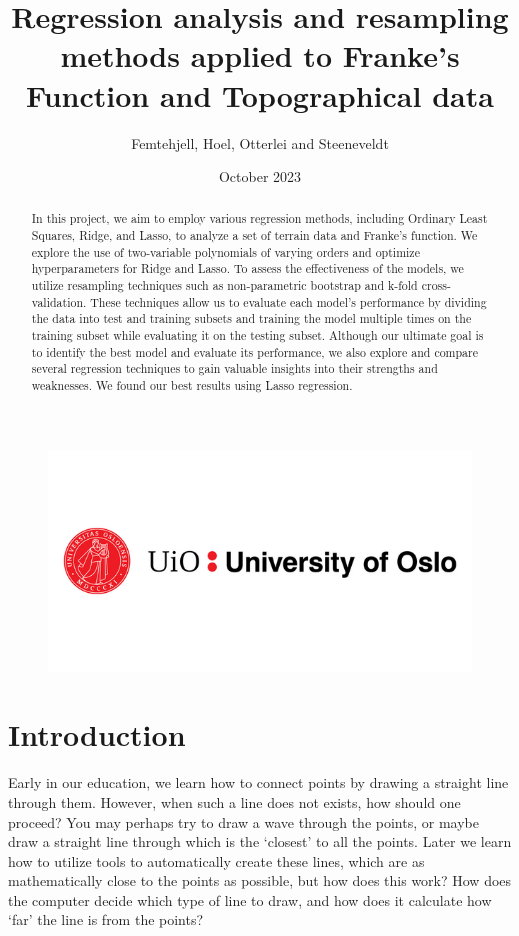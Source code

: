 \documentclass{article}
\title{Regression analysis and resampling methods applied to Franke's Function and Topographical data}
\author{Femtehjell, Hoel, Otterlei and Steeneveldt}
\date{October 2023}
\begin{document}

\maketitle
\begin{figure}[H]
    \centering
    \includegraphics[scale=0.5]{1797261_uio-logo.png}
\end{figure}
\newpage
\tableofcontents
\listoffigures

\newpage

\begin{abstract} 
    In this project, we aim to employ various regression methods, including Ordinary Least Squares, Ridge, and Lasso, to analyze a set of terrain data and Franke's function. We explore the use of two-variable polynomials of varying orders and optimize hyperparameters for Ridge and Lasso. To assess the effectiveness of the models, we utilize resampling techniques such as non-parametric bootstrap and k-fold cross-validation. These techniques allow us to evaluate each model's performance by dividing the data into test and training subsets and training the model multiple times on the training subset while evaluating it on the testing subset. Although our ultimate goal is to identify the best model and evaluate its performance, we also explore and compare several regression techniques to gain valuable insights into their strengths and weaknesses. We found our best results using Lasso regression.
\end{abstract}

\section{Introduction}
Early in our education, we learn how to connect points by drawing a straight line through them. However, when such a line does not exists, how should one proceed? You may perhaps try to draw a wave through the points, or maybe draw a straight line through which is the `closest' to all the points. Later we learn how to utilize tools to automatically create these lines, which are as mathematically close to the points as possible, but how does this work? How does the computer decide which type of line to draw, and how does it calculate how `far' the line is from the points?
\end{document}
